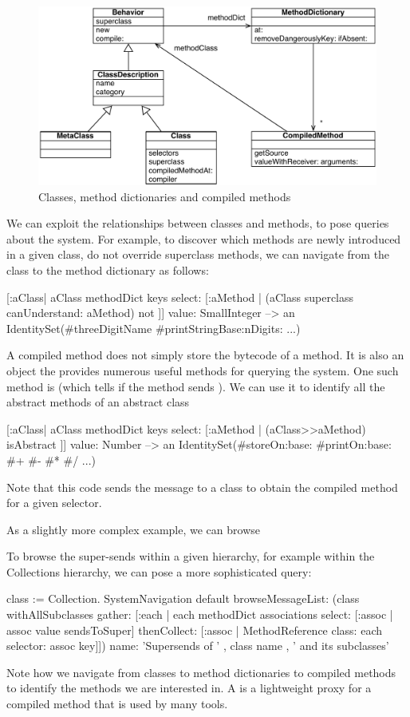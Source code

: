 \documentclass[a4paper,10pt,twoside]{book}
\begin{document}
\begin{figure}[ht]\centering
	\includegraphics[width=0.8\linewidth]{MethodsAsObjects}
	\caption{Classes, method dictionaries and compiled methods\label{fig:MethodsAsObjects}}
\end{figure}

We can exploit the relationships between classes and methods, to pose queries about the system.
For example, to discover which methods are newly introduced in a given class, \ie do not override superclass methods, we can navigate from the class to the method dictionary as follows:
\begin{code}{}
[:aClass| aClass methodDict keys select: [:aMethod |
  (aClass superclass canUnderstand: aMethod) not ]] value: SmallInteger
  --> an IdentitySet(#threeDigitName #printStringBase:nDigits: ...)
\end{code}

A compiled method does not simply store the bytecode of a method.
It is also an object the provides numerous useful methods for querying the system.
One such method is  (which tells if the method sends ).
We can use it to identify all the abstract methods of an abstract class
\begin{code}{}
[:aClass| aClass methodDict keys select: [:aMethod |
  (aClass>>aMethod) isAbstract ]] value: Number
  --> an IdentitySet(#storeOn:base: #printOn:base: #+ #- #* #/ ...)
\end{code}
Note that this code sends the \ct{>>} message to a class to obtain the compiled method for a given selector.

As a slightly more complex example, we can browse 

To browse the super-sends within a given hierarchy, for example within the Collections hierarchy, we can pose a more sophisticated query:
\begin{code}{}
class := Collection.
SystemNavigation default
  browseMessageList: (class withAllSubclasses gather: [:each |
    each methodDict associations
      select: [:assoc | assoc value sendsToSuper]
      thenCollect: [:assoc | MethodReference class: each selector: assoc key]])
  name: 'Supersends of ' , class name , ' and its subclasses'
\end{code}
Note how we navigate from classes to method dictionaries to compiled methods to identify the methods we are interested in.
A  is a lightweight proxy for a compiled method that is used by many tools.
\end{document}
